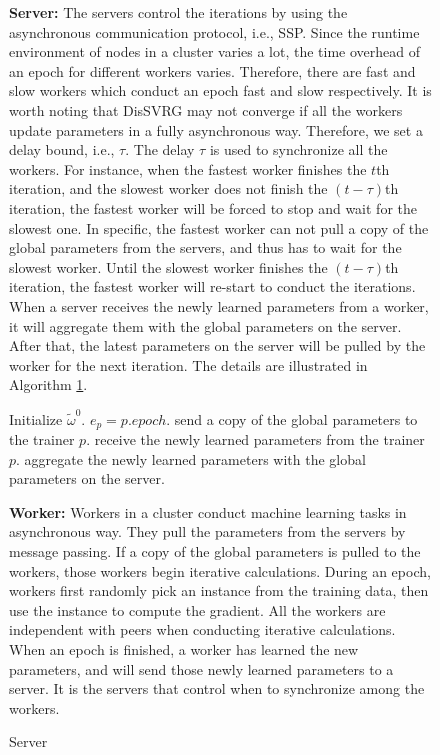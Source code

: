 \documentclass[preprint,review,11pt,a4paper]{elsarticle}
\begin{document}
\begin{figure}
\textbf{Server:}    The servers control the iterations by using the asynchronous communication protocol, i.e., SSP.  Since the runtime environment of nodes in a cluster varies a lot, the  time overhead of an epoch for different workers  varies. Therefore, there are fast and slow workers which conduct an epoch fast and slow respectively.   It is worth noting that DisSVRG may not converge if all the workers update parameters in a fully asynchronous way. Therefore, we set a delay bound, i.e., $\tau$. The delay $\tau$ is used to synchronize all the workers. For instance, when the fastest worker finishes the $t$th iteration, and the slowest worker does not finish the $(t-\tau)$th iteration, the fastest worker will be forced to stop and wait for the slowest one. In specific, the fastest worker can not  pull a copy of the global parameters from the servers, and thus has to wait for the slowest worker. Until the slowest worker finishes the $(t-\tau)$th iteration, the fastest worker will re-start to conduct the iterations. When a server receives the newly learned parameters from a worker, it will aggregate them with the global parameters on the server. After that, the latest parameters on the server will be pulled by the worker for the next iteration.
The details are illustrated in Algorithm \ref{algorithm_dis_svrg_server}.

\begin{algorithm}[t]
    \caption{Server}
    \label{algorithm_dis_svrg_server}
    \begin{algorithmic}[1]
        \State Initialize $\tilde{\omega}^0$.
               \State $e_p=p.epoch$.
                    \State send a copy of the global parameters to the trainer $p$.
                \EndIf
            \EndIf
                \State receive the newly learned parameters from the trainer $p$.
                \State aggregate the newly learned parameters with the global parameters on the server.
            \EndIf
        \EndWhile
    \end{algorithmic}
\end{algorithm}

\textbf{Worker:} Workers in a cluster conduct machine learning tasks in asynchronous way. They pull the parameters from the servers by message passing. If a  copy of the global parameters is pulled to the workers, those workers begin iterative calculations. During an epoch, workers first randomly pick an instance from the training data, then use the instance to compute the gradient.  All the workers are independent with peers when conducting iterative calculations. When an epoch is finished, a worker has learned the new parameters, and will send those newly learned parameters to a server. It is the servers that control when to synchronize among the workers.


\end{figure}
\end{document}
